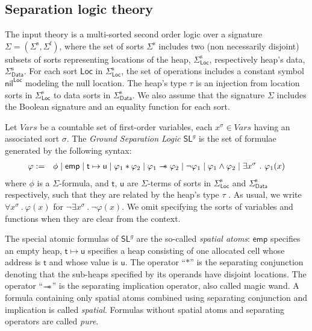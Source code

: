 \documentclass[orivec]{llncs}
\newcommand{\ssorts}[1]{#1^\mathrm{s}}
\newcommand{\sfuns}[1]{#1^\mathrm{f}}
\newcommand{\locs}{\mathsf{Loc}}
\newcommand{\data}{\mathsf{Data}}
\newcommand{\nil}{\mathsf{nil}}
\newcommand{\emp}{\mathsf{emp}}
\newcommand{\wand}{
 \mathrel{\mbox{$\hspace*{-0.03em}\mathord{-}\hspace*{-0.66em}
 \mathord{-}\hspace*{-0.36em}\mathord{*}$\hspace*{-0.005em}}}} %
\newcommand{\seplog}{\mathsf{SL}}
\newcommand{\tterm}{\mathsf{t}}
\newcommand{\uterm}{\mathsf{u}}
\newcommand{\vars}{\mathit{Vars}}
\begin{document}
\subsection{Separation logic theory}

The input theory is a multi-sorted second order logic over a 
signature $\Sigma=(\ssorts{\Sigma},\sfuns{\Sigma})$,
where the set of sorts $\ssorts{\Sigma}$ includes two (non necessarily disjoint)
subsets of sorts representing locations of the heap, $\ssorts{\Sigma}_\locs$,
respectively heap's data, $\ssorts{\Sigma}_\data$. For each sort $\locs$ in
$\ssorts{\Sigma}_\locs$, the set of operations includes a constant symbol
$\nil^\locs$ modeling the null location. The heap's type $\tau$ is an injection 
from location sorts in $\ssorts{\Sigma}_\locs$ 
to data sorts in $\ssorts{\Sigma}_\data$.
We also assume that the signature $\Sigma$ includes the Boolean signature
and an equality function for each sort.

Let $\vars$ be a countable set of first-order variables, each
$x^\sigma \in \vars$ having an associated sort $\sigma$.
The \emph{Ground Separation Logic} $\seplog^g$ is 
the set of formulae generated by the following syntax:
\begin{eqnarray}
\varphi & := & \phi \mid \emp \mid \tterm \mapsto \uterm \mid
\varphi_1 * \varphi_2 \mid \varphi_1 \wand \varphi_2 \mid \neg
\varphi_1 \mid \varphi_1 \wedge \varphi_2 \mid \exists x^\sigma ~.~
\varphi_1(x)
\label{eqn:SLg}
\end{eqnarray}
where $\phi$ is a $\Sigma$-formula, and $\tterm$, $\uterm$ are
$\Sigma$-terms of sorts in $\ssorts{\Sigma}_\locs$ and $\ssorts{\Sigma}_\data$
respectively, such that they are related by the heap's type $\tau$ .
As usual,
we write $\forall x^\sigma ~.~ \varphi(x)$ for $\neg\exists x^\sigma
~.~ \neg\varphi(x)$. We omit specifying the sorts of variables and
functions when they are clear from the context.

The special atomic formulas of $\seplog^g$ are the so-called \emph{spatial atoms}:
$\emp$ specifies an empty heap, 
$\tterm \mapsto \uterm$ specifies a heap consisting of one allocated cell
whose address is $\tterm$ and whose value is $\uterm$.
The operator ``$*$'' is the separating conjunction denoting
that the sub-heaps specified by its operands have disjoint locations.
The operator ``$\wand$'' is the separating implication operator, 
also called magic wand. %
A formula containing only spatial atoms combined using 
separating conjunction and implication is called \emph{spatial}. 
Formulas without spatial atoms and separating operators are called \emph{pure}.
\end{document}
